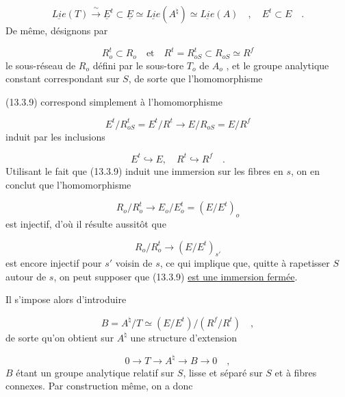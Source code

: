 \begin{equation}\tag{13.3.10}
\underline{Lie}(T) \xrightarrow{\ \sim\ } \underline{E}^{t} \subset \underline{E} \simeq \underline{Lie}(A^{\natural}) \simeq \underline{Lie}(A) \quad , \quad E^{t} \subset E \quad .
\end{equation}
De même, désignons par

\begin{equation}\tag{13.3.11}
R_o^{t} \subset R_o \quad \mathrm{et} \quad R^{t} = R_{oS}^{t} \subset R_{oS} \simeq R^{f}
\end{equation}
le sous-réseau de $R_o$ défini par le sous-tore $T_o$ de $A_o$ , et le groupe analytique constant correspondant sur $S$, de sorte que l'homomorphisme



(13.3.9) correspond simplement à l'homomorphisme

\begin{equation*}
E^{t}/R_{oS}^{t} = E^{t}/R^{t} \longrightarrow E/R_{oS} = E/R^{f}
\end{equation*}
induit par les inclusions

\begin{equation*}
E^{t} \hookrightarrow E, \quad R^{t} \hookrightarrow R^{f} \quad .
\end{equation*}
Utilisant le fait que (13.3.9) induit une immersion sur les fibres en $s$, on en conclut que l'homomorphisme

\begin{equation*}
R_o/R_o^{t} \longrightarrow E_o/E_o^{t} = (E/E^{t})_o
\end{equation*}
est injectif, d'où il résulte aussitôt que

\begin{equation*}
R_o/R_o^{t} \longrightarrow (E/E^{t})_{s'}
\end{equation*}
est encore injectif pour $s'$ voisin de $s$, ce qui implique que, quitte à rapetisser $S$ autour de $s$, on peut supposer que (13.3.9) \underline{est une immersion fermée}.

Il s'impose alors d'introduire

\begin{equation}\tag{13.3.12}
B = A^{\natural}/T \simeq (E/E^{t})/(R^{f}/R^{t}) \quad ,
\end{equation}
de sorte qu'on obtient sur $A^{\natural}$ une structure d'extension

\begin{equation}\tag{13.3.13}
0 \longrightarrow T \longrightarrow A^{\natural} \longrightarrow B \longrightarrow 0 \quad ,
\end{equation}
$B$ étant un groupe analytique relatif sur $S$, lisse et séparé sur $S$ et à fibres connexes. Par construction même, on a donc

